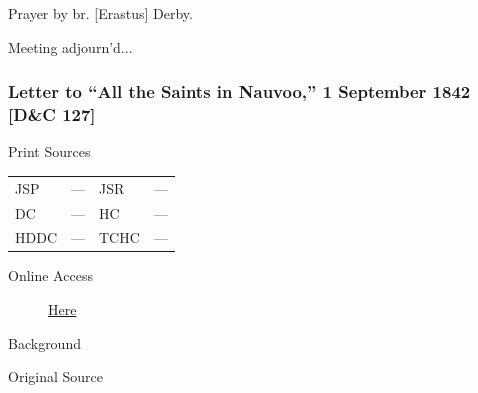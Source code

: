 				Prayer by br. [Erastus] Derby.

				Meeting adjourn'd...
				
		\subsubsection{Letter to ``All the Saints in Nauvoo,'' 1 September 1842 [D\&C 127]}
			\label{EMS-1842-JS-1-SEP-1842}
		
			\begin{description}
				\item[Print Sources]
			\end{description}

			\begin{tabular}{p{0.5in}p{1in}p{0.5in}p{1in}}
				JSP	 	& ---		& JSR 		& --- \\
				DC	 	& ---		& HC 		& --- \\
				HDDC 	& ---		& TCHC 		& --- \\
			\end{tabular}
			
			\begin{description}
				\item[Online Access] \href{https://www.josephsmithpapers.org/paper-summary/letter-to-all-the-saints-in-nauvoo-1-september-1842-dc-127/1}{Here}
			\end{description}
			
			\begin{description}
				\item[Background]
			\end{description}
			
			
			\begin{description}
				\item[Original Source]
			\end{description}
			
			
